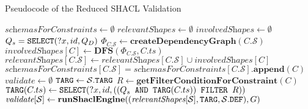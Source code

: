 \begin{algorithm}[H]
    \caption{Pseudocode of the Reduced SHACL Validation}\label{algo:reduced_shacl_validation}
    \begin{algorithmic}[1]
            \State $\textit{schemasForConstraints} \gets \emptyset$             
            \State $\textit{relevantShapes} \gets \emptyset$  \label{algo:reduced_shacl_validation:reachableShapesStart}
            \State $\textit{involvedShapes} \gets \emptyset$ 
            \State $Q_s = \texttt{SELECT}(?x,id, Q_D)$ 
                \State $\Phi_{C.\mathcal{S}} \gets \textbf{createDependencyGraph}(C.\mathcal{S})$
                \State $\textit{involvedShapes}[C] \gets \textbf{DFS}(\Phi_{C.\mathcal{S}}, C.ts)$
                \State $\textit{relevantShapes}[C.\mathcal{S}] \gets \textit{relevantShapes}[C.\mathcal{S}] \cup \textit{involvedShapes}[C]$
                \State $\textit{schemasForConstraints}[C.\mathcal{S}] = \textit{schemasForConstraints}[C.\mathcal{S}].\mathbf{append}(C)$
            \EndFor \label{algo:reduced_shacl_validation:reachableShapesEnd}
            \State $\textit{validate} \gets \emptyset$
             \label{algo:reduced_shacl_validation:EachShapeSchema}
                \State $\texttt{TARG} \gets \mathcal{S}.\texttt{TARG}$
                 \label{algo:reduced_shacl_validation:subset_selection_start}
                        \State $R \gets \textbf{getFilterConditionForConstraint}(C)$ \label{algo:reduced_shacl_validation:filter_condition}
                        \State $\texttt{TARG}(C.ts) \gets \texttt{SELECT}(?x,id,((Q_s \texttt{ AND } \texttt{TARG}(C.ts)) \texttt{ FILTER } R))$
                    \EndIf
                \EndFor \label{algo:reduced_shacl_validation:subset_selection_end}
                \State $\textit{validate}[\mathcal{S}] \gets \mathbf{runShaclEngine}((\textit{relevantShapes}[\mathcal{S}],\texttt{TARG}, \mathcal{S}.\texttt{DEF}), G)$ \label{algo:reduced_shacl_validation:runShaclEngine}
            \EndFor
            \State {}
        \EndFunction
    \end{algorithmic}
\end{algorithm}